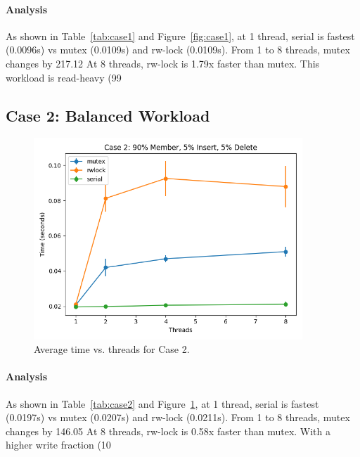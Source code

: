 \documentclass{article}
\begin{document}
\paragraph{Analysis}
As shown in Table~\ref{tab:case1} and Figure~\ref{fig:case1}, at 1 thread, serial is fastest (0.0096s) vs mutex (0.0109s) and rw-lock (0.0109s).
From 1 to 8 threads, mutex changes by 217.12%
At 8 threads, rw-lock is 1.79x faster than mutex.
This workload is read-heavy (99%
\newpage
\subsection*{Case 2: Balanced Workload}
\begin{figure}[h!]
\centering
\includegraphics[width=0.9\textwidth]{report/graphs/case2_plot.png}
\caption{Average time vs. threads for Case 2.}
\label{fig:case2}
\end{figure}
\paragraph{Analysis}
As shown in Table~\ref{tab:case2} and Figure~\ref{fig:case2}, at 1 thread, serial is fastest (0.0197s) vs mutex (0.0207s) and rw-lock (0.0211s).
From 1 to 8 threads, mutex changes by 146.05%
At 8 threads, rw-lock is 0.58x faster than mutex.
With a higher write fraction (10%
\newpage
\end{document}
